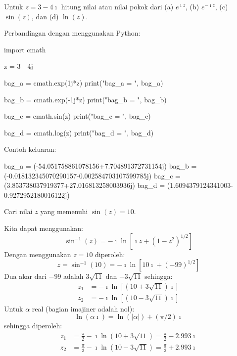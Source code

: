 \begin{contoh}
Untuk $z = 3 - 4\imath$ hitung nilai atau nilai pokok dari (a) $e^{\imath z}$,
(b) $e^{-\imath z}$, (c) $\sin(z)$, dan (d) $\ln(z)$. 
\end{contoh}

Perbandingan dengan menggunakan Python:
\begin{pythoncode}
import cmath

z = 3 - 4j
    
bag_a = cmath.exp(1j*z)
print("bag_a = ", bag_a)

bag_b = cmath.exp(-1j*z)
print("bag_b = ", bag_b)

bag_c = cmath.sin(z)
print("bag_c = ", bag_c)

bag_d = cmath.log(z)
print("bag_d = ", bag_d)    
\end{pythoncode}

Contoh keluaran:
\begin{textcode}
bag_a =  (-54.051758861078156+7.704891372731154j)
bag_b =  (-0.018132345070290157-0.002584703107599785j)
bag_c =  (3.853738037919377+27.016813258003936j)
bag_d =  (1.6094379124341003-0.9272952180016122j)
\end{textcode}


\begin{contoh}
Cari nilai $z$ yang memenuhi $\sin(z) = 10$.

Kita dapat menggunakan:
\begin{equation*}
\sin^{-1}(z) = -\imath \ln\left[\imath z+\left(1-z^{2}\right)^{1/2}\right]
\end{equation*}
Dengan menggunakan $z = 10$ diperoleh:
\begin{equation*}
z = \sin^{-1}(10) = -\imath \ln \left[ 10\imath + (-99)^{1/2} \right]
\end{equation*}
Dua akar dari $-99$ adalah $3\sqrt{11}$ dan $-3\sqrt{11}$ sehingga:
\begin{align*}
z_1 & = -\imath \ln\left[ (10 + 3\sqrt{11})\imath \right] \\
z_2 & = -\imath \ln\left[ (10 - 3\sqrt{11})\imath \right]
\end{align*}
Untuk $\alpha$ real (bagian imajiner adalah nol):
\begin{equation*}
\ln(\alpha \imath) = \ln(|\alpha|) + (\pi/2)\imath
\end{equation*}
sehingga diperoleh:
\begin{align*}
z_1 & = \frac{\pi}{2} - \imath \ln(10 + 3\sqrt{11}) = \frac{\pi}{2} - 2.993\imath \\
z_2 & = \frac{\pi}{2} - \imath \ln(10 - 3\sqrt{11}) = \frac{\pi}{2} + 2.993\imath
\end{align*}

\end{contoh}

